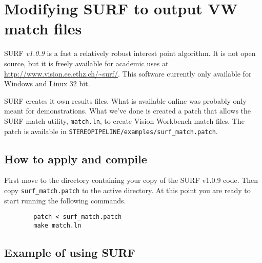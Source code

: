 \chapter{Modifying SURF to output VW match files}
\label{appendix_surf}

SURF \emph{v1.0.9} is a fast a relatively robust interest point
algorithm. It is not open source, but it is freely available for
academic uses at \url{http://www.vision.ee.ethz.ch/~surf/}. This
software currently only available for Windows and Linux 32 bit.

SURF creates it own results files. What is available online was
probably only meant for demonstrations. What we've done is created a
patch that allows the SURF match utility, \texttt{match.ln}, to create
Vision Workbench match files. The patch is available in
\verb=STEREOPIPELINE/examples/surf_match.patch=.

\section{How to apply and compile}

First move to the directory containing your copy of the SURF v1.0.9
code. Then copy \texttt{surf\_match.patch} to the active directory. At
this point you are ready to start running the following commands.

\begin{verbatim}
        patch < surf_match.patch
        make match.ln
\end{verbatim}

\begin{center}
\end{center}

\section{Example of using SURF}

